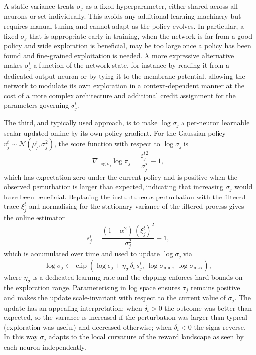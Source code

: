     A static variance treats $\sigma_j$ as a fixed hyperparameter, either shared
    across all neurons or set individually.
    This avoids any additional learning machinery but requires manual tuning and
    cannot adapt as the policy evolves.
    In particular, a fixed $\sigma_j$ that is appropriate early in training, when
    the network is far from a good policy and wide exploration is beneficial, may
    be too large once a policy has been found and fine-grained exploitation is
    needed.
    A more expressive alternative makes $\sigma_j^t$ a function of the network
    state, for instance by reading it from a dedicated output neuron or by tying
    it to the membrane potential, allowing the network to modulate its own
    exploration in a context-dependent manner at the cost of a more complex
    architecture and additional credit assignment for the parameters governing
    $\sigma_j^t$.
    
    The third, and typically used approach, is to make $\log\sigma_j$ a
    per-neuron learnable scalar updated online by its own policy gradient.
    For the Gaussian policy $v_j^t \sim \mathcal{N}(\mu_j^t, \sigma_j^2)$,
    the score function with respect to $\log\sigma_j$ is
    \[
        \nabla_{\log\sigma_j} \log\pi_j
        =
        \frac{\varepsilon_j^{t\,2}}{\sigma_j^2} - 1,
    \]
    which has expectation zero under the current policy and is positive when the
    observed perturbation is larger than expected, indicating that increasing
    $\sigma_j$ would have been beneficial.
    Replacing the instantaneous perturbation with the filtered trace $\xi_j^t$
    and normalising for the stationary variance of the filtered process gives the
    online estimator
    \[
        s_j^t
        =
        \frac{(1-\alpha^2)\,(\xi_j^t)^2}{\sigma_j^2} - 1,
    \]
    which is accumulated over time and used to update $\log\sigma_j$ via
    \[
        \log\sigma_j
        \leftarrow
        \operatorname{clip}\!\left(
            \log\sigma_j + \eta_\sigma\, \delta_t\, s_j^t,\;
            \log\sigma_{\min},\;
            \log\sigma_{\max}
        \right),
    \]
    where $\eta_\sigma$ is a dedicated learning rate and the clipping enforces
    hard bounds on the exploration range.
    Parameterising in log space ensures $\sigma_j$ remains positive and makes the
    update scale-invariant with respect to the current value of $\sigma_j$.
    The update has an appealing interpretation: when $\delta_t > 0$ the outcome
    was better than expected, so the variance is increased if the perturbation was
    larger than typical (exploration was useful) and decreased otherwise; when
    $\delta_t < 0$ the signs reverse.
    In this way $\sigma_j$ adapts to the local curvature of the reward landscape
    as seen by each neuron independently.
    
